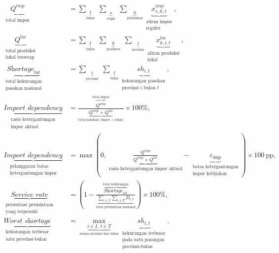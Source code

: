 \documentclass{file/TA-ITS}
\theoremstyle{definition}
\theoremstyle{definition}
\theoremstyle{plain}
\begin{document}
\begin{align}
\underbrace{Q^{imp}}_{\substack{\text{total impor}}}
&=
\sum_{\underbrace{t}_{\text{bulan}}} \;\sum_{\underbrace{s}_{\text{origin}}} \;\sum_{\underbrace{h}_{\text{pelabuhan}}}
\underbrace{x^{imp}_{s,h,t}}_{\substack{\text{aliran impor}\\\text{reguler}}},
\label{eq:metric_total_import}
\\
\underbrace{Q^{loc}}_{\substack{\text{total produksi}\\\text{lokal terserap}}}
&=
\sum_{\underbrace{t}_{\text{bulan}}} \;\sum_{\underbrace{k}_{\text{produsen}}} \;\sum_{\underbrace{i}_{\text{provinsi}}}
\underbrace{x^{loc}_{k,i,t}}_{\substack{\text{aliran produksi}\\\text{lokal}}},
\label{eq:metric_total_local}
\\
\underbrace{\textit{Shortage}_{tot}}_{\substack{\text{total kekurangan}\\\text{pasokan nasional}}}
&=
\sum_{\underbrace{i}_{\text{provinsi}}} \;\sum_{\underbrace{t}_{\text{bulan}}}
\underbrace{sh_{i,t}}_{\substack{\text{kekurangan pasokan}\\\text{provinsi }i\text{ bulan }t}},
\label{eq:metric_shortage}
\\
\underbrace{\textit{Import dependency}}_{\substack{\text{rasio ketergantungan}\\\text{impor aktual}}}
&=
\frac{\overbrace{Q^{imp}}^{\text{total impor}}}{\underbrace{Q^{imp}+Q^{loc}}_{\text{total pasokan (impor + lokal)}}}
\times 100\%,
\label{eq:metric_import_dependency}
\\
\underbrace{\textit{Import dependency violation}}_{\substack{\text{pelanggaran batas}\\\text{ketergantungan impor}}}
&=
\max\!\left(
0,\;
\underbrace{\frac{Q^{imp}}{Q^{imp}+Q^{loc}}}_{\text{rasio ketergantungan impor aktual}}
-
\underbrace{\varepsilon_{\text{imp}}}_{\substack{\text{batas ketergantungan}\\\text{impor kebijakan}}}
\right)
\times 100\ \text{pp},
\label{eq:metric_import_violation}
\\
\underbrace{\textit{Service rate}}_{\substack{\text{persentase permintaan}\\\text{yang terpenuhi}}}
&=
\left(
1 -
\frac{\overbrace{\textit{Shortage}_{tot}}^{\text{total kekurangan}}}
{\underbrace{\sum_{i \in I}\sum_{t \in T} D_{i,t}}_{\text{total permintaan nasional}}}
\right)
\times 100\%,
\label{eq:service_rate}
\\
\underbrace{\textit{Worst shortage}}_{\substack{\text{kekurangan terbesar}\\\text{satu provinsi-bulan}}}
&=
\max_{\underbrace{i \in I,\ t \in T}_{\text{semua provinsi dan bulan}}}
\underbrace{sh_{i,t}}_{\substack{\text{kekurangan terbesar}\\\text{pada satu pasangan}\\\text{provinsi-bulan}}}.
\label{eq:metric_worst_shortage}
\end{align}
\end{document}
